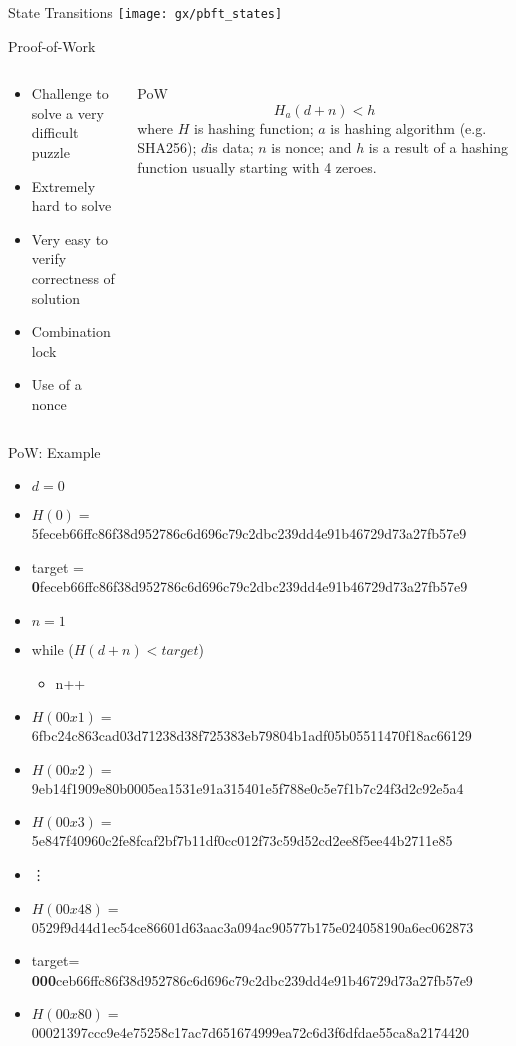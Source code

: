 \documentclass[pdf,table]{beamer}
\begin{document}
\begin{frame}{State Transitions}
	\texttt{[image: gx/pbft\_states]}
\end{frame}

\begin{frame}{Proof-of-Work}
	\begin{columns}[T]
		\begin{column}{0.48\textwidth}
			\begin{itemize}
				\item Challenge to solve a very difficult puzzle
				\item Extremely hard to solve 
				\item Very easy to verify correctness of solution
				\item Combination lock
				\item Use of a nonce
			\end{itemize}
		\end{column}
		\begin{column}{0.48\textwidth}
			\begin{block}{PoW}
				\begin{equation}
					H_{a}(d+n) < h
				\end{equation}
				where $H$ is hashing function; $a$ is hashing algorithm (e.g. SHA256); $d$is data; $n$ is nonce; and $h$ is a result of a hashing function usually starting with 4 zeroes.
			\end{block}
		\end{column}
	\end{columns}	
\end{frame}


\begin{frame}{PoW: Example}
	\begin{itemize}
		\scriptsize
		\item $d = 0$
		\item $H(0) =$ 5feceb66ffc86f38d952786c6d696c79c2dbc239dd4e91b46729d73a27fb57e9
		\item target = 	{\bf0}feceb66ffc86f38d952786c6d696c79c2dbc239dd4e91b46729d73a27fb57e9
		\item $n=1$
		\item while ($H(d+n) < target$)
			\begin{itemize}
				\item n++
			\end{itemize}
		\item $H(00x1)=$ 6fbc24c863cad03d71238d38f725383eb79804b1adf05b05511470f18ac66129
		\item $H(00x2)=$ 9eb14f1909e80b0005ea1531e91a315401e5f788e0c5e7f1b7c24f3d2c92e5a4
		\item $H(00x3)=$ 5e847f40960c2fe8fcaf2bf7b11df0cc012f73c59d52cd2ee8f5ee44b2711e85
		\item \vdots
		\item $H(00x48)=$ 0529f9d44d1ec54ce86601d63aac3a094ac90577b175e024058190a6ec062873
		\item target= {\bf 000}ceb66ffc86f38d952786c6d696c79c2dbc239dd4e91b46729d73a27fb57e9
		\item $H(00x80)=$ 00021397ccc9e4e75258c17ac7d651674999ea72c6d3f6dfdae55ca8a2174420
		\normalsize
	\end{itemize}
\end{frame}
\end{document}
